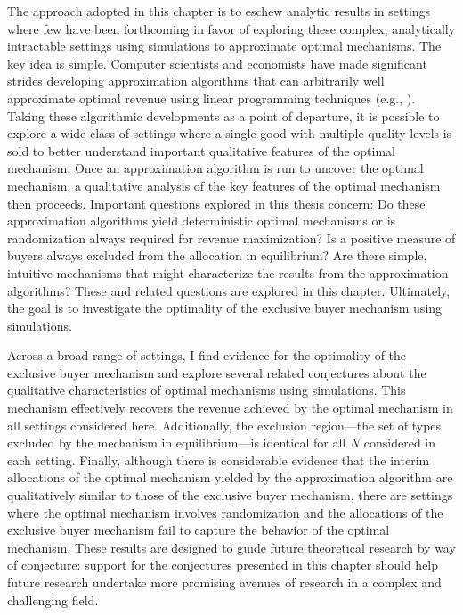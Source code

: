 \documentclass{article}
\begin{document}
The approach adopted in this chapter is to eschew analytic results in settings where few have been forthcoming in favor of exploring these complex, analytically intractable settings using simulations to approximate optimal mechanisms. The key idea is simple. Computer scientists and economists have made significant strides developing approximation algorithms that can arbitrarily well approximate optimal revenue using linear programming techniques (e.g., \cite{cai2012,belloni2010multidimensional}). Taking these algorithmic developments as a point of departure, it is possible to explore a wide class of settings where a single good with multiple quality levels is sold to better understand important qualitative features of the optimal mechanism. Once an approximation algorithm is run to uncover the optimal mechanism, a qualitative analysis of the key features of the optimal mechanism then proceeds. Important questions explored in this thesis concern: Do these approximation algorithms yield deterministic optimal mechanisms or is randomization always required for revenue maximization? Is a positive measure of buyers always excluded from the allocation in equilibrium? Are there simple, intuitive mechanisms that might characterize the results from the approximation algorithms? These and related questions are explored in this chapter. Ultimately, the goal is to investigate the optimality of the exclusive buyer mechanism using simulations.


Across a broad range of settings, I find evidence for the optimality of the exclusive buyer mechanism and explore several related conjectures about the qualitative characteristics of optimal mechanisms using simulations. This mechanism effectively recovers the revenue achieved by the optimal mechanism in all settings considered here. Additionally, the exclusion region---the set of types excluded by the mechanism in equilibrium---is identical for all $N$ considered in each setting. Finally, although there is considerable evidence that the interim allocations of the optimal mechanism yielded by the approximation algorithm are qualitatively similar to those of the exclusive buyer mechanism, there are settings where the optimal mechanism involves randomization and the allocations of the exclusive buyer mechanism fail to capture the behavior of the optimal mechanism. These results are designed to guide future theoretical research by way of conjecture: support for the conjectures presented in this chapter should help future research undertake more promising avenues of research in a complex and challenging field.
\end{document}
